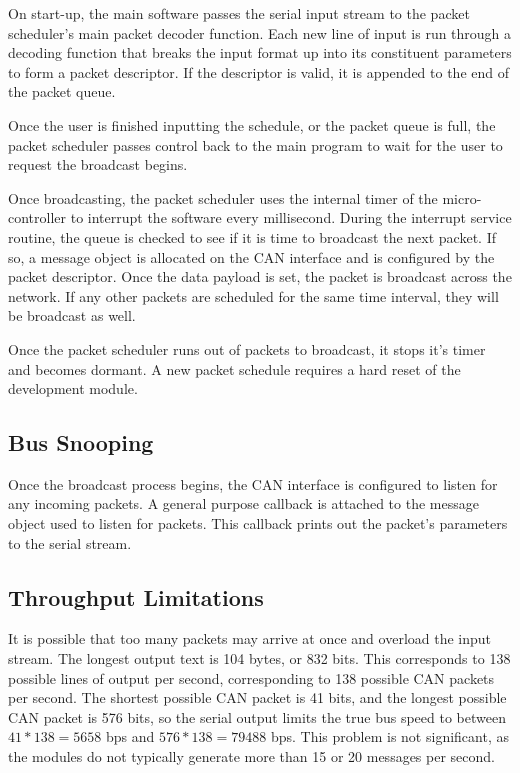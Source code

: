 On start-up, the main software passes the serial input stream to the packet scheduler's main packet decoder function. Each new line of input is run through a decoding function that breaks the input format up into its constituent parameters to form a packet descriptor. If the descriptor is valid, it is appended to the end of the packet queue.

Once the user is finished inputting the schedule, or the packet queue is full, the packet scheduler passes control back to the main program to wait for the user to request the broadcast begins.

Once broadcasting, the packet scheduler uses the internal timer of the micro-controller to interrupt the software every millisecond. During the interrupt service routine, the queue is checked to see if it is time to broadcast the next packet. If so, a message object is allocated on the CAN interface and is configured by the packet descriptor. Once the data payload is set, the packet is broadcast across the network. If any other packets are scheduled for the same time interval, they will be broadcast as well. 

Once the packet scheduler runs out of packets to broadcast, it stops it's timer and becomes dormant. A new packet schedule requires a hard reset of the development module.

\subsection{Bus Snooping}

Once the broadcast process begins, the CAN interface is configured to listen for any incoming packets. A general purpose callback is attached to the message object used to listen for packets. This callback prints out the packet's parameters to the serial stream. 

\subsection{Throughput Limitations}

It is possible that too many packets may arrive at once and overload the input stream. The longest output text is 104 bytes, or 832 bits. This corresponds to 138 possible lines of output per second, corresponding to 138 possible CAN packets per second. The shortest possible CAN packet is 41 bits, and the longest possible CAN packet is 576 bits, so the serial output limits the true bus speed to between $41*138 = 5658$ bps and $576 * 138 = 79488$ bps. This problem is not significant, as the modules do not typically generate more than 15 or 20 messages per second.

